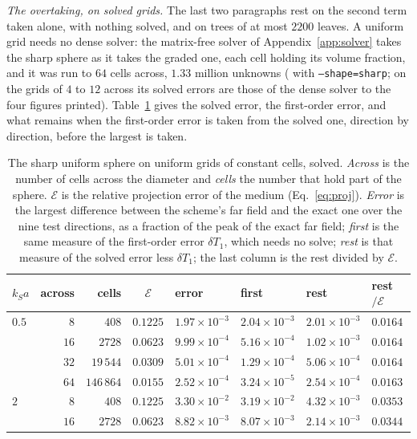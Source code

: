 \documentclass[11pt,a4paper]{article}
\newcommand{\cE}{\mathcal{E}}
\begin{document}
\emph{The overtaking, on solved grids.} The last two paragraphs rest on the second term taken alone,
with nothing solved, and on trees of at most $2200$ leaves. A uniform grid needs no dense solver: the
matrix-free solver of Appendix~\ref{app:solver} takes the sharp sphere as it takes the graded one, each
cell holding its volume fraction, and it was run to $64$ cells across, $1.33$ million unknowns
( with \texttt{--shape=sharp}; on the grids of $4$ to $12$ across
its solved errors are those of the dense solver to the four figures printed). Table~\ref{tab:sharpsolved}
gives the solved error, the first-order error, and what remains when the first-order error is taken from
the solved one, direction by direction, before the largest is taken.
\begin{table}[htbp]
\centering
\caption{The sharp uniform sphere on uniform grids of constant cells, solved. \emph{Across} is the
number of cells across the diameter and \emph{cells} the number that hold part of the sphere. $\cE$ is
the relative projection error of the medium (Eq.~\eqref{eq:proj}). \emph{Error} is the largest
difference between the scheme's far field and the exact one over the nine test directions, as a
fraction of the peak of the exact far field; \emph{first} is the same measure of the first-order error
$\delta T_1$, which needs no solve; \emph{rest} is that measure of the solved error less $\delta T_1$;
the last column is the rest divided by $\cE$.}\label{tab:sharpsolved}
\small
\begin{tabular}{@{}lrrcllll@{}}
\toprule
$k_Sa$ & across & cells & $\cE$ & error & first & rest & rest$/\cE$ \\
\midrule
$0.5$ & $8$  & $408$      & $0.1225$ & $1.97\times10^{-3}$ & $2.04\times10^{-3}$ & $2.01\times10^{-3}$ & $0.0164$ \\
      & $16$ & $2728$     & $0.0623$ & $9.99\times10^{-4}$ & $5.16\times10^{-4}$ & $1.02\times10^{-3}$ & $0.0164$ \\
      & $32$ & $19\,544$  & $0.0309$ & $5.01\times10^{-4}$ & $1.29\times10^{-4}$ & $5.06\times10^{-4}$ & $0.0164$ \\
      & $64$ & $146\,864$ & $0.0155$ & $2.52\times10^{-4}$ & $3.24\times10^{-5}$ & $2.54\times10^{-4}$ & $0.0163$ \\
\midrule
$2$   & $8$  & $408$      & $0.1225$ & $3.30\times10^{-2}$ & $3.19\times10^{-2}$ & $4.32\times10^{-3}$ & $0.0353$ \\
      & $16$ & $2728$     & $0.0623$ & $8.82\times10^{-3}$ & $8.07\times10^{-3}$ & $2.14\times10^{-3}$ & $0.0344$ \\

\end{tabular}
\end{table}
\end{document}
